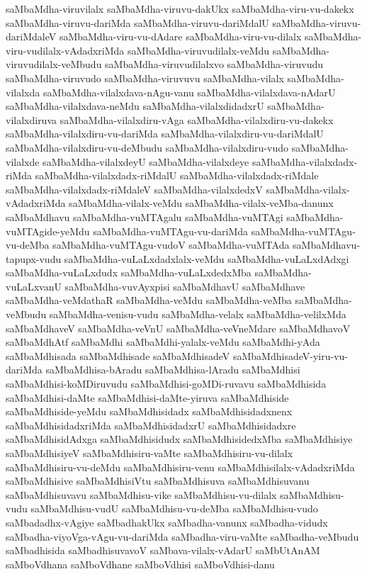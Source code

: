{saMbaMdha-viruvilalx
saMbaMdha-viruvu-dakUkx
saMbaMdha-viru-vu-dakekx
saMbaMdha-viruvu-dariMda
saMbaMdha-viruvu-dariMdalU
saMbaMdha-viruvu-dariMdaleV
saMbaMdha-viru-vu-dAdare
saMbaMdha-viru-vu-dilalx
saMbaMdha-viru-vudilalx-vAdadxriMda
saMbaMdha-viruvudilalx-veMdu
saMbaMdha-viruvudilalx-veMbudu
saMbaMdha-viruvudilalxvo
saMbaMdha-viruvudu
saMbaMdha-viruvudo
saMbaMdha-viruvuvu
saMbaMdha-vilalx
saMbaMdha-vilalxda
saMbaMdha-vilalxdava-nAgu-vanu
saMbaMdha-vilalxdava-nAdarU
saMbaMdha-vilalxdava-neMdu
saMbaMdha-vilalxdidadxrU
saMbaMdha-vilalxdiruva
saMbaMdha-vilalxdiru-vAga
saMbaMdha-vilalxdiru-vu-dakekx
saMbaMdha-vilalxdiru-vu-dariMda
saMbaMdha-vilalxdiru-vu-dariMdalU
saMbaMdha-vilalxdiru-vu-deMbudu
saMbaMdha-vilalxdiru-vudo
saMbaMdha-vilalxde
saMbaMdha-vilalxdeyU
saMbaMdha-vilalxdeye
saMbaMdha-vilalxdadx-riMda
saMbaMdha-vilalxdadx-riMdalU
saMbaMdha-vilalxdadx-riMdale
saMbaMdha-vilalxdadx-riMdaleV
saMbaMdha-vilalxdedxV
saMbaMdha-vilalx-vAdadxriMda
saMbaMdha-vilalx-veMdu
saMbaMdha-vilalx-veMba-danunx
saMbaMdhavu
saMbaMdha-vuMTAgalu
saMbaMdha-vuMTAgi
saMbaMdha-vuMTAgide-yeMdu
saMbaMdha-vuMTAgu-vu-dariMda
saMbaMdha-vuMTAgu-vu-deMba
saMbaMdha-vuMTAgu-vudoV
saMbaMdha-vuMTAda
saMbaMdhavu-tapupx-vudu
saMbaMdha-vuLaLxdadxlalx-veMdu
saMbaMdha-vuLaLxdAdxgi
saMbaMdha-vuLaLxdudx
saMbaMdha-vuLaLxdedxMba
saMbaMdha-vuLaLxvanU
saMbaMdha-vuvAyxpisi
saMbaMdhavU
saMbaMdhave
saMbaMdha-veMdathaR
saMbaMdha-veMdu
saMbaMdha-veMba
saMbaMdha-veMbudu
saMbaMdha-venisu-vudu
saMbaMdha-velalx
saMbaMdha-velilxMda
saMbaMdhaveV
saMbaMdha-veVnU
saMbaMdha-veVneMdare
saMbaMdhavoV
saMbaMdhAtf
saMbaMdhi
saMbaMdhi-yalalx-veMdu
saMbaMdhi-yAda
saMbaMdhisada
saMbaMdhisade
saMbaMdhisadeV
saMbaMdhisadeV-yiru-vu-dariMda
saMbaMdhisa-bAradu
saMbaMdhisa-lAradu
saMbaMdhisi
saMbaMdhisi-koMDiruvudu
saMbaMdhisi-goMDi-ruvavu
saMbaMdhisida
saMbaMdhisi-daMte
saMbaMdhisi-daMte-yiruva
saMbaMdhiside
saMbaMdhiside-yeMdu
saMbaMdhisidadx
saMbaMdhisidadxnenx
saMbaMdhisidadxriMda
saMbaMdhisidadxrU
saMbaMdhisidadxre
saMbaMdhisidAdxga
saMbaMdhisidudx
saMbaMdhisidedxMba
saMbaMdhisiye
saMbaMdhisiyeV
saMbaMdhisiru-vaMte
saMbaMdhisiru-vu-dilalx
saMbaMdhisiru-vu-deMdu
saMbaMdhisiru-venu
saMbaMdhisilalx-vAdadxriMda
saMbaMdhisive
saMbaMdhisiVtu
saMbaMdhisuva
saMbaMdhisuvanu
saMbaMdhisuvavu
saMbaMdhisu-vike
saMbaMdhisu-vu-dilalx
saMbaMdhisu-vudu
saMbaMdhisu-vudU
saMbaMdhisu-vu-deMba
saMbaMdhisu-vudo
saMbadadhx-vAgiye
saMbadhakUkx
saMbadha-vanunx
saMbadha-vidudx
saMbadha-viyoVga-vAgu-vu-dariMda
saMbadha-viru-vaMte
saMbadha-veMbudu
saMbadhisida
saMbadhisuvavoV
saMbava-vilalx-vAdarU
saMbUtAnAM
saMboVdhana
saMboVdhane
saMboVdhisi
saMboVdhisi-danu
}
